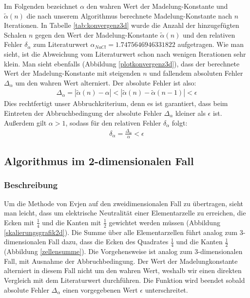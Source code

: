 \documentclass[10pt,a4paper]{article}
\begin{document}
Im Folgenden bezeichnet $\alpha$ den wahren Wert der Madelung-Konstante
und $\tilde{\alpha}(n)$ die nach unserem Algorithmus berechnete Madelung-Konstante
nach $n$ Iterationen.
In Tabelle \ref{tab:konvergenz3d} wurde die Anzahl der hinzugefügten Schalen $n$
gegen den Wert der Madelung-Konstante $\tilde{\alpha}(n)$ und den relativen Fehler $\delta_\alpha$ zum
Literaturwert $\alpha_{NaCl} = 1.7475646946331822$ \cite{Sakamoto} aufgetragen.
Wie man sieht, ist die Abweichung vom Literaturwert schon nach wenigen Iterationen
sehr klein.
Man sieht ebenfalls (Abbildung \ref{plotkonvergenz3d}), dass der berechnete Wert
der Madelung-Konstante mit steigenden $n$ und fallendem absoluten Fehler $\Delta_\alpha$ um
den wahren Wert alterniert. Der absolute Fehler ist also:
\begin{align}
	\Delta_\alpha = | \tilde{\alpha}(n) - \alpha | < | \tilde{\alpha}(n) - \tilde{\alpha}(n-1)| < \epsilon
\end{align}
Dies rechtfertigt unser Abbruchkriterium, denn es ist garantiert, dass beim Eintreten der
Abbruchbedingung der absolute Fehler $\Delta_\alpha$ kleiner als $\epsilon$ ist.
Außerdem gilt $\alpha > 1$, sodass für den relativen Fehler $\delta_\alpha$ folgt:
\begin{align}
	\delta_\alpha = \frac{\Delta_\alpha}{\alpha} < \epsilon
\end{align}

\subsection{Algorithmus im 2-dimensionalen Fall}
\subsubsection{Beschreibung}
Um die Methode von Evjen auf den zweidimensionalen Fall zu übertragen, sieht man leicht,
dass um elektrische Neutralität einer Elementarzelle zu erreichen, die Ecken mit $\frac{1}{4}$
und die Kanten mit $\frac{1}{2}$ gewichtet werden müssen (Abbildung \ref{skalierungsgrafik2d}).
Die Summe über alle Elementarzellen führt analog zum 3-dimensionalen Fall dazu, dass die Ecken
des Quadrates $\frac{1}{4}$ und die Kanten $\frac{1}{2}$ (Abbildung \ref{zellensumme}).
Die Vorgehensweise ist analog zum 3-dimensionalen Fall, mit Ausnahme der Abbruchbedingung.
Der Wert der Madelungkonstante alterniert in diesem Fall nicht um den wahren Wert, weshalb
wir einen direkten Vergleich mit dem Literaturwert durchführen. Die Funktion wird beendet
sobald absolute Fehler $\Delta_\alpha$ einen vorgegebenen Wert $\epsilon$ unterschreitet.
\end{document}
